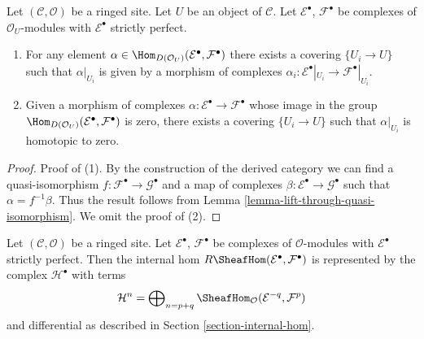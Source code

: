 \begin{lemma}
\label{lemma-local-actual}
Let $(\mathcal{C}, \mathcal{O})$ be a ringed site. Let $U$ be an object
of $\mathcal{C}$. Let $\mathcal{E}^\bullet$, $\mathcal{F}^\bullet$ be
complexes of $\mathcal{O}_U$-modules with $\mathcal{E}^\bullet$ strictly
perfect.
\begin{enumerate}
\item For any element
$\alpha \in \Hom_{D(\mathcal{O}_U)}(\mathcal{E}^\bullet, \mathcal{F}^\bullet)$
there exists a covering $\{U_i \to U\}$ such that
$\alpha|_{U_i}$ is given by a morphism of complexes
$\alpha_i : \mathcal{E}^\bullet|_{U_i} \to \mathcal{F}^\bullet|_{U_i}$.
\item Given a morphism of complexes
$\alpha : \mathcal{E}^\bullet \to \mathcal{F}^\bullet$
whose image in the group
$\Hom_{D(\mathcal{O}_U)}(\mathcal{E}^\bullet, \mathcal{F}^\bullet)$
is zero, there exists a covering $\{U_i \to U\}$ such that
$\alpha|_{U_i}$ is homotopic to zero.
\end{enumerate}
\end{lemma}

\begin{proof}
Proof of (1).
By the construction of the derived category we can find a quasi-isomorphism
$f : \mathcal{F}^\bullet \to \mathcal{G}^\bullet$ and a map of complexes
$\beta : \mathcal{E}^\bullet \to \mathcal{G}^\bullet$ such that
$\alpha = f^{-1}\beta$. Thus the result follows from
Lemma \ref{lemma-lift-through-quasi-isomorphism}.
We omit the proof of (2).
\end{proof}

\begin{lemma}
\label{lemma-Rhom-strictly-perfect}
Let $(\mathcal{C}, \mathcal{O})$ be a ringed site.
Let $\mathcal{E}^\bullet$, $\mathcal{F}^\bullet$ be complexes
of $\mathcal{O}$-modules with $\mathcal{E}^\bullet$ strictly perfect.
Then the internal hom $R\SheafHom(\mathcal{E}^\bullet, \mathcal{F}^\bullet)$
is represented by the complex $\mathcal{H}^\bullet$ with terms
$$
\mathcal{H}^n =
\bigoplus\nolimits_{n = p + q}
\SheafHom_\mathcal{O}(\mathcal{E}^{-q}, \mathcal{F}^p)
$$
and differential as described in Section \ref{section-internal-hom}.
\end{lemma}

